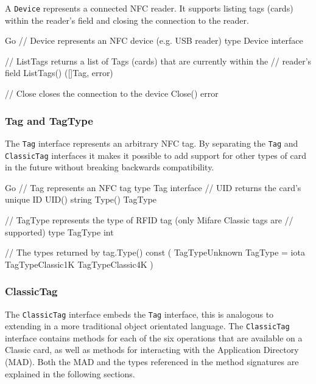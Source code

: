 \documentclass[dissertation.tex]{subfiles}
\begin{document}
  A \texttt{Device} represents a connected NFC reader. It supports listing tags (cards) within the reader's field and closing the connection to the reader.

  \begin{code}[numbers=none]{Go}
    // Device represents an NFC device (e.g. USB reader)
    type Device interface {
    	// ListTags returns a list of Tags (cards) that are currently within the
    	// reader's field
    	ListTags() ([]Tag, error)

    	// Close closes the connection to the device
    	Close() error
    }
  \end{code}

  \subsubsection{Tag and TagType}
  The \texttt{Tag} interface represents an arbitrary NFC tag. By separating the \texttt{Tag} and \texttt{ClassicTag} interfaces it makes it possible to add support for other types of card in the future without breaking backwards compatibility.

  \begin{code}[numbers=none]{Go}
    // Tag represents an NFC tag
    type Tag interface {
    	// UID returns the card's unique ID
    	UID() string
    	Type() TagType
    }

    // TagType represents the type of RFID tag (only Mifare Classic tags are
    // supported)
    type TagType int

    // The types returned by tag.Type()
    const (
    	TagTypeUnknown TagType = iota
    	TagTypeClassic1K
    	TagTypeClassic4K
    )
  \end{code}

  \subsubsection{ClassicTag}
  The \texttt{ClassicTag} interface embeds the \texttt{Tag} interface, this is analogous to extending in a more traditional object orientated language. The \texttt{ClassicTag} interface contains methods for each of the six operations that are available on a \mifare{} Classic card, as well as methods for interacting with the \mifare{} Application Directory (MAD). Both the MAD and the types referenced in the method signatures are explained in the following sections.
\end{document}

